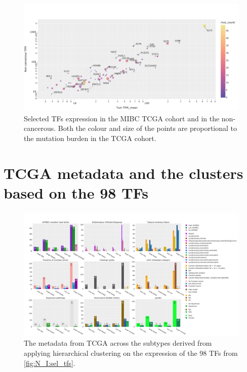 \begin{figure}[!htb]
    \centering
    \includegraphics[width=1.0\textwidth,keepaspectratio]{Sections/Network_I/Resources/selective_pruning/sel_tfs/sel_tfs_mean_tum_healthy.png}
    \caption{Selected TFs expression in the MIBC TCGA cohort and in the non-cancerous. Both the colour and size of the points are proportional to the mutation burden in the TCGA cohort.}
    \label{fig:ap:sel_tfs_mean}
\end{figure}



\section{TCGA metadata and the clusters based on the 98 TFs} \label{s:ap:sel_prun_tcga_meta}


\begin{figure}[!htb]   
    \centering
    \includegraphics[width=1.0\textwidth,keepaspectratio]{Sections/Network_I/Resources/selective_pruning/sel_tfs/sel_tfs_tcga_meta.png}
      \caption{The metadata from TCGA \cite{Robertson2017-mg} across the subtypes derived from applying hierarchical clustering on the expression of the 98 TFs from \cref{fig:N_I:sel_tfs}. }
    \label{fig:ap:sel_tfs_tcga_metadata}
\end{figure}

